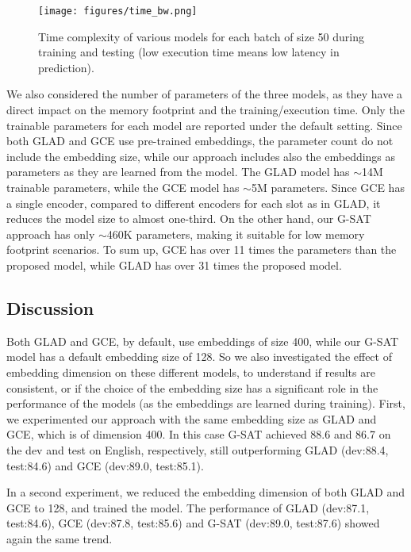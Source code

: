 \documentclass{article}
\begin{document}
\begin{figure}
    \centering
    \texttt{[image: figures/time\_bw.png]}
    \caption{Time complexity of various models for each batch of size 50 during training and testing (low execution time means low latency in prediction).}
    \label{fig:time}
\end{figure}

We also considered the number of parameters of the three models, as they have a direct impact on the memory footprint and the training/execution time.
Only the trainable parameters for each model are reported under the default setting.
Since both GLAD and GCE use pre-trained embeddings, the parameter count do not include the embedding size, while our approach includes also the embeddings as parameters as they are learned from the model.
The GLAD model has $\sim$14M trainable parameters, while the GCE model has $\sim$5M parameters.
Since GCE has a single encoder, compared to different encoders for each slot as in GLAD, it reduces the model size to almost one-third.
On the other hand, our G-SAT approach has only $\sim$460K parameters, making it suitable for low memory footprint scenarios. To sum up, GCE  has over 11 times the  parameters than the proposed model, while GLAD has over 31 times the proposed model.

\subsection{Discussion}
Both GLAD and GCE, by default, use  embeddings of size 400, while our G-SAT model has a default embedding size of 128.
So we also investigated the effect of embedding dimension on these different models, to understand if  results are consistent, or if the choice of the embedding size has a significant role in the performance of the models (as the embeddings are learned during training).
First, we experimented our approach with the same embedding size as GLAD and GCE, which is of dimension 400.
In this case G-SAT achieved 88.6 and 86.7 on the dev and test on English, respectively, still outperforming GLAD (dev:88.4, test:84.6) and GCE (dev:89.0, test:85.1).

In a second experiment, we reduced the embedding dimension of both GLAD and GCE to 128, and trained the model.
The performance of GLAD (dev:87.1, test:84.6), GCE (dev:87.8, test:85.6) and G-SAT (dev:89.0, test:87.6) showed again the same trend.
\end{document}
